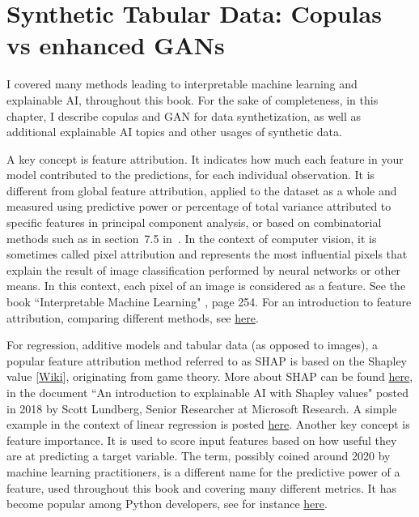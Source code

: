 \documentclass[oneside,10pt]{book}
\begin{document}

\chapter{Synthetic Tabular Data: Copulas vs enhanced GANs}{}\label{newai}

  I covered many methods leading to interpretable machine learning and \textcolor{index}{explainable AI}, throughout this book. For the sake of completeness, in this chapter, I describe copulas and GAN for data synthetization, as well as additional explainable AI topics and other usages of
synthetic data.

A key concept is \textcolor{index}{feature attribution}. It indicates how much each feature in your model contributed to the predictions, for each individual observation. It is different from global feature attribution, applied to the dataset as a whole and measured using \textcolor{index}{predictive power} 
  or percentage of total variance attributed to specific features in 
\textcolor{index}{principal component analysis}, or based on combinatorial methods such as in  section~7.5 in~\cite{vgelsevier}. In the context of computer vision, it is sometimes called pixel
 attribution and represents the most influential pixels that explain the result of image classification performed by neural networks or other means. In this context, each pixel of an image is considered as a feature. See the book ``Interpretable Machine Learning" \cite{cmol}, page 254. For an introduction to feature attribution, comparing different methods, see 
 \href{https://cloud.google.com/ai-platform/prediction/docs/ai-explanations/overview}{here}.

For regression, additive models and tabular data (as opposed to images), a popular feature attribution method referred to as SHAP is based on the 
\textcolor{index}{Shapley value} [\href{https://en.wikipedia.org/wiki/Shapley_value}{Wiki}], originating from game theory. More about SHAP can be
 found 
\href{https://shap.readthedocs.io/en/latest/example_notebooks/overviews/An\%20introduction\%20to\%20explainable\%20AI\%20with\%20Shapley\%20values.html}{here},
 in the document ``An introduction to explainable AI with Shapley values" posted in 2018 by Scott Lundberg, Senior Researcher at Microsoft Research.
 A simple example in the context of linear regression is posted 
\href{https://towardsdatascience.com/explainable-ai-xai-with-shap-regression-problem-b2d63fdca670}{here}. Another key concept is \textcolor{index}{feature importance}. It is used to score input features based on how useful they are at predicting a target variable. 
The term, possibly coined around 2020 by machine learning practitioners, is a different name for the 
\textcolor{index}{predictive power} of a feature, used throughout this book and covering many different metrics. It has become
 popular among Python developers, see for instance \href{https://machinelearningmastery.com/calculate-feature-importance-with-python/}{here}.
\end{document}
